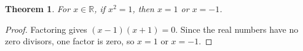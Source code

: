 \documentclass{article}
\newtheorem{theorem}{Theorem}
\begin{document}
\begin{theorem}\label{thm:real-square-roots-clean}
For $x\in\mathbb R$, if $x^2=1$, then $x=1$ or $x=-1$.
\end{theorem}
\begin{proof}
Factoring gives $(x-1)(x+1)=0$. Since the real numbers have no zero divisors, one factor is zero, so $x=1$ or $x=-1$.
\end{proof}
\end{document}

